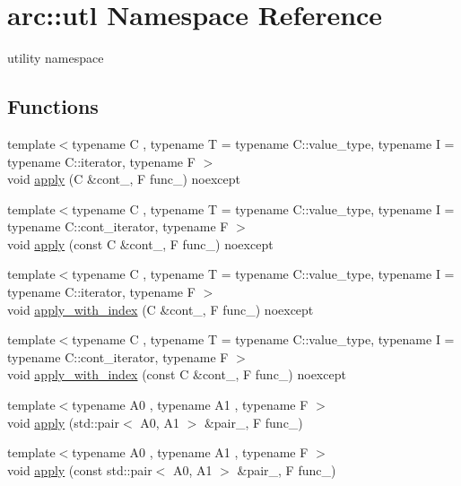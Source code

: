\hypertarget{namespacearc_1_1utl}{}\section{arc\+:\+:utl Namespace Reference}
\label{namespacearc_1_1utl}


utility namespace  


\subsection*{Functions}
\begin{DoxyCompactItemize}
\item 
{\footnotesize template$<$typename C , typename T  = typename C\+::value\+\_\+type, typename I  = typename C\+::iterator, typename F $>$ }\\void \mbox{\hyperlink{namespacearc_1_1utl_a7e7db05c1cbc593d3bf9361621f763f3}{apply}} (C \&cont\+\_\+, F func\+\_\+) noexcept
\item 
{\footnotesize template$<$typename C , typename T  = typename C\+::value\+\_\+type, typename I  = typename C\+::cont\+\_\+iterator, typename F $>$ }\\void \mbox{\hyperlink{namespacearc_1_1utl_ae56f75d104c7bd4bd9abf350e349a694}{apply}} (const C \&cont\+\_\+, F func\+\_\+) noexcept
\item 
{\footnotesize template$<$typename C , typename T  = typename C\+::value\+\_\+type, typename I  = typename C\+::iterator, typename F $>$ }\\void \mbox{\hyperlink{namespacearc_1_1utl_a77de5138bbfff1ea74f34f3018361186}{apply\+\_\+with\+\_\+index}} (C \&cont\+\_\+, F func\+\_\+) noexcept
\item 
{\footnotesize template$<$typename C , typename T  = typename C\+::value\+\_\+type, typename I  = typename C\+::cont\+\_\+iterator, typename F $>$ }\\void \mbox{\hyperlink{namespacearc_1_1utl_a50e140f40e5a25a5fe253b94e6ab3403}{apply\+\_\+with\+\_\+index}} (const C \&cont\+\_\+, F func\+\_\+) noexcept
\item 
{\footnotesize template$<$typename A0 , typename A1 , typename F $>$ }\\void \mbox{\hyperlink{namespacearc_1_1utl_a77c34280ea834583a0a0563e2bdc549c}{apply}} (std\+::pair$<$ A0, A1 $>$ \&pair\+\_\+, F func\+\_\+)
\item 
{\footnotesize template$<$typename A0 , typename A1 , typename F $>$ }\\void \mbox{\hyperlink{namespacearc_1_1utl_a887b8885b94d550a15de9eef1a70fd0b}{apply}} (const std\+::pair$<$ A0, A1 $>$ \&pair\+\_\+, F func\+\_\+)

\end{DoxyCompactItemize}

